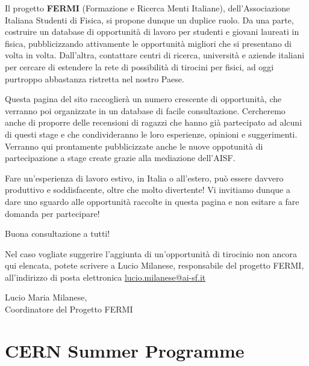 \documentclass[a4paper,10pt]{article}
\begin{document}
Il progetto \textbf{FERMI} (Formazione e Ricerca Menti Italiane), dell’Associazione Italiana Studenti di Fisica, si propone dunque un duplice ruolo. Da una parte, costruire un database di opportunità di lavoro per studenti e giovani laureati in fisica, pubblicizzando attivamente le opportunità migliori che si presentano di volta in volta. Dall’altra, contattare centri di ricerca, università e aziende italiani per cercare di estendere la rete di possibilità di tirocini per fisici, ad oggi purtroppo abbastanza ristretta nel nostro Paese. \newline

Questa pagina del sito raccoglierà un numero crescente di opportunità, che verranno poi organizzate in un database di facile consultazione. Cercheremo anche di proporre delle recensioni di ragazzi che hanno già partecipato ad alcuni di questi stage e che condivideranno le loro esperienze, opinioni e suggerimenti. Verranno qui prontamente pubblicizzate anche le nuove oppotunità di partecipazione a stage create grazie alla mediazione dell’AISF. \newline

Fare un’esperienza di lavoro estivo, in Italia o all’estero, può essere davvero produttivo e soddisfacente, oltre che molto divertente! Vi invitiamo dunque a dare uno sguardo alle opportunità raccolte in questa pagina e non esitare a fare domanda per partecipare! \newline

Buona consultazione a tutti! \newline

Nel caso vogliate suggerire l’aggiunta di un’opportunità di tirocinio non ancora qui elencata, potete scrivere a Lucio Milanese, responsabile del progetto FERMI, all’indirizzo di posta elettronica \href{mailto:lucio.milanese@ai-sf.it}{lucio.milanese@ai-sf.it} \newline

\begin{flushright}
  Lucio Maria Milanese, \\
Coordinatore del Progetto FERMI
\end{flushright}
\newpage

\tableofcontents

\section{CERN Summer Programme}
\end{document}
